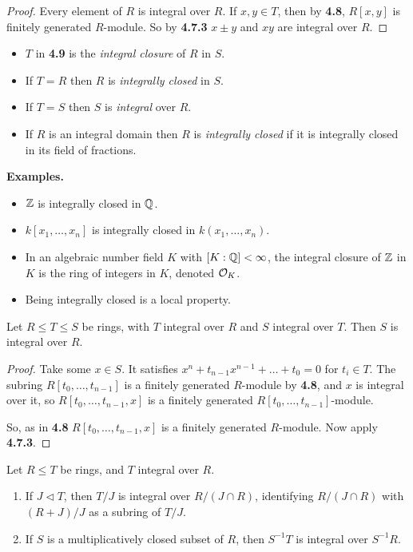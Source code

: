 \documentclass[10pt,a4paper]{article}
\begin{document}
\begin{proof}
  Every element of $R$ is integral over $R$. If $x, y \in T$, then by \textbf{4.8}, $R[x,y]$ is finitely generated $R$-module. So by \textbf{4.7.3} $x\pm y$ and $xy$ are integral over $R$.
\end{proof}
\begin{definition}\hspace*{0cm}
  \begin{itemize}
    \item $T$ in \textbf{4.9} is the \emph{integral closure} of $R$ in $S$.
    \item If $T=R$ then $R$ is \emph{integrally closed} in $S$.
    \item If $T=S$ then $S$ is \emph{integral} over $R$.
    \item If $R$ is an integral domain then $R$ is \emph{integrally closed} if it is integrally closed in its field of fractions.
  \end{itemize}
\end{definition}
\textbf{Examples.}
\begin{itemize}
  \item $\mathbb{Z}$ is integrally closed in $\mathbb{Q}$.
  \item $k[x_1, \ldots, x_n]$ is integrally closed in $k(x_1, \ldots, x_n)$.
  \item In an algebraic number field $K$ with $[K:\mathbb{Q}]<\infty$, the integral closure of $\mathbb{Z}$ in $K$ is the ring of integers in $K$, denoted $\mathcal{O}_K$.
  \item Being integrally closed is a local property.
\end{itemize}
\begin{lemma}
  Let $R\leq T\leq S$ be rings, with $T$ integral over $R$ and $S$ integral over $T$. Then $S$ is integral over $R$.
\end{lemma}
\begin{proof}
  Take some $x \in S$. It satisfies $x^n + t_{n-1}x^{n-1} + \ldots +t_0 = 0$ for $t_i \in T$. The subring $R[t_0, \ldots, t_{n-1}]$ is a finitely generated $R$-module by \textbf{4.8}, and $x$ is integral over it, so $R[t_0, \ldots, t_{n-1}, x]$ is a finitely generated $R[t_0, \ldots, t_{n-1}]$-module.

  So, as in \textbf{4.8} $R[t_0, \ldots, t_{n-1}, x]$ is a finitely generated $R$-module. Now apply \textbf{4.7.3}.
\end{proof}
\begin{lemma}
  Let $R \leq T$ be rings, and $T$ integral over $R$.
  \begin{enumerate}
    \item If $J \triangleleft T$, then $T/J$ is integral over $R/(J\cap R)$, identifying $R/(J\cap R)$ with $(R+J)/J$ as a subring of $T/J$.

    \item If $S$ is a multiplicatively closed subset of $R$, then $S^{-1}T$ is integral over $S^{-1}R$.
  \end{enumerate}
\end{lemma}
\end{document}
